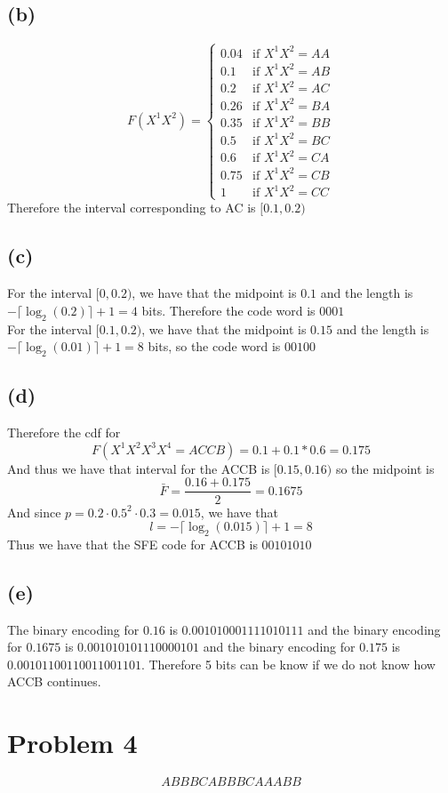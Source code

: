 \subsection*{(b)}
$$F(X^1X^2)=\begin{cases}
    0.04 & \text{if }X^1X^2=AA\\
    0.1 & \text{if }X^1X^2=AB\\
    0.2 & \text{if }X^1X^2=AC\\
    0.26 & \text{if }X^1X^2=BA\\
    0.35 & \text{if }X^1X^2=BB\\
    0.5 & \text{if }X^1X^2=BC\\
    0.6 & \text{if }X^1X^2=CA\\
    0.75 & \text{if }X^1X^2=CB\\
    1 & \text{if }X^1X^2=CC
\end{cases}$$
Therefore the interval corresponding to AC is 
$[0.1,0.2)$
\subsection*{(c)}
For the interval $[0,0.2)$, 
we have that the midpoint is $0.1$ and the length is $
-\lceil \log_2(0.2)\rceil +1=4$ bits. Therefore the code word is 
$\boxed{0001}$\\
For the interval $[0.1,0.2)$, we have that 
the midpoint is $0.15$ and the length is $
-\lceil \log_2(0.01)\rceil +1=8$ bits, so the code word is
$\boxed{00100}$
\subsection*{(d)}
Therefore the cdf for 
$$F(X^1X^2X^3X^4=ACCB)=0.1+0.1*0.6=0.175$$
And thus we have that interval for the ACCB
is $[0.15,0.16)$ so the midpoint is 
$$\bar{F}=\frac{0.16+0.175}{2}=0.1675$$
And since $p=0.2\cdot 0.5^2 \cdot 0.3=0.015$, we have that
$$l=-\lceil \log_2(0.015)\rceil +1=8$$
Thus we have that the SFE code for ACCB is $\boxed{00101010}$
\subsection*{(e)}
The binary encoding for $0.16$ is $0.001010001111010111$
and the binary encoding for $0.1675$ is $0.001010101110000101$
and the binary encoding for $0.175$ is $0.00101100110011001101$. Therefore
5 bits can be know if we do not know how ACCB continues.
\section*{Problem 4}
$$\boxed{ABBBCABBBCAAABB}$$



